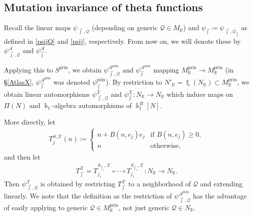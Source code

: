\documentclass{amsart}
\DeclareMathOperator{\prin}{prin}
\let\bb=\mathbb
\let\rar=\rightarrow
\let\s=\mathcal
\newcommand {\kk} {\Bbbk}
\newcommand {\kt} {\kk_t}
\newcommand {\sQ} {\mathcal{Q}}
\newcommand {\jj} {\vec{\jmath}}
\renewcommand{\xi}{\upxi}
\theoremstyle{plain}%
\theoremstyle{definition}
\theoremstyle{remark}
\begin{document}
\subsection{Mutation invariance of theta functions}\label{MutInvTheta}

Recall the linear maps $\psi_{\jj,\sQ}$ (depending on generic $\sQ\in M_{\bb{R}}$) and $\psi_{\jj}\coloneqq \psi_{\jj,\sQ_{\jj}}$ as defined in \eqref{psijQ} and \eqref{psij}, respectively.  From now on, we will denote these by $\psi_{\jj,\sQ}^{\s{A}}$ and $\psi_{\jj}^{\s{A}}$.



Applying this to $S^{\prin}$, we obtain $\psi^{\s{A}^{\prin}}_{\jj,\sQ}$ and $\psi_{\jj}^{\s{A}^{\prin}}$ mapping $M^{\prin}_{\bb{R}}\rar M^{\prin}_{\bb{R}}$ (in \S \ref{AtlasX}, $\psi_{\jj}^{\s{A}^{\prin}}$ was denoted $\psi_{\jj}^{\prin}$).  By restriction to $N'_{\bb{R}}=\xi(N_{\bb{R}})\subset M^{\prin}_{\bb{R}}$, we obtain linear automorphisms $\psi^{\s{X}}_{\jj,\sQ}$ and $\psi_{\jj}^{\s{X}}\colon N_{\bb{R}}\rar N_{\bb{R}}$ which induce maps on $\Pi(N)$ and $\kt$-algebra automorphisms of $\kk_t^{B}[N]$.

More directly, let \begin{align*}
    T_{j}^{S,\s{X}}(n)\coloneqq \begin{cases}
n+B(n,e_j) e_j & \mbox{if $B(n,e_j) \geq 0$},\\
n & \mbox{otherwise},
\end{cases}
\end{align*}
and then let
\begin{align}\label{TjX}
    T_{\jj}^{\s{X}}=T^{S_{\jj_s},\s{X}}_{j_s}\circ \cdots \circ T^{S_{\jj_1},\s{X}}_{j_1}\colon N_{\bb{R}}\rar N_{\bb{R}}.
\end{align}
Then $\psi^{\s{X}}_{\jj,\sQ}$ is obtained by restricting $T_{\jj}^{\s{X}}$ to a neighborhood of $\s{Q}$ and extending linearly.  We note that the definition as the restriction of $\psi^{\s{A}^{\prin}}_{\jj,\sQ}$ has the advantage of easily applying to generic $\sQ\in M_{\bb{R}}^{\prin}$, not just generic $\sQ\in N_{\bb{R}}$.
\end{document}
